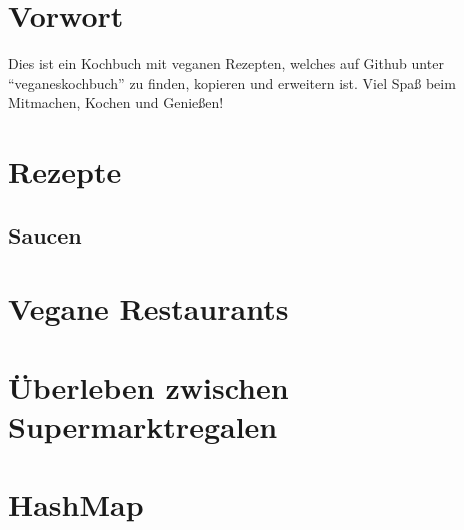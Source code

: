 \documentclass[12pt,a4paper]{article}
\begin{document}


\section{Vorwort}
Dies ist ein Kochbuch mit veganen Rezepten, welches auf Github unter \enquote{veganeskochbuch} zu finden, kopieren und erweitern ist. Viel Spaß beim Mitmachen, Kochen und Genießen!

\clearpage
\section{Rezepte}
	
    
	
    
    
    
	
	
	
	
	
	
	
	
	
	
	
	
	
	

\clearpage	
\subsection[Saucen]{Saucen}
	
	
	
	
\clearpage
\section{Vegane Restaurants}
	
	
	
	
	
	

\clearpage
\section{Überleben zwischen Supermarktregalen}


\clearpage
\section{HashMap}
	
	
\end{document}
